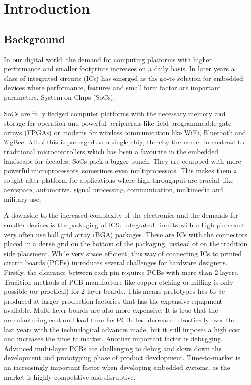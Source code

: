 \section{Introduction}

\subsection{Background}

In our digital world, the demand for computing platforms with higher performance and smaller footprints increases on a daily basis. In later years a class of integrated circuits (ICs) has emerged as the go-to solution for embedded devices where performance, features and small form factor are important parameters, System on Chips (SoCs).

SoCs are fully fledged computer platforms with the necessary memory and storage for operation and powerful peripherals like field programmeable gate arrays (FPGAs) or modems for wireless communication like WiFi, Bluetooth and ZigBee. All of this is packaged on a single chip, thereby the name. In contrast to traditional microcontrollers which has been a favourite in the embedded landscape for decades, SoCs pack a bigger punch. They are equipped with more powerful microprocessors, sometimes even multiprocessors. This makes them a sought after platform for applications where high throughput are crucial, like aerospace, automotive, signal processing, communication, multimedia and military use.

A downside to the increased complexity of the electronics and the demands for smaller devices is the packaging of ICS. Integrated circuits with a high pin count very often use ball grid array (BGA) packages. These are ICs with the connectors placed in a dense grid on the bottom of the packaging, instead of on the tradition side placement. While very space efficient, this way of connecting ICs to printed circuit boards (PCBs) introduces several challenges for hardware designers. Firstly, the clearance between each pin requires PCBs with more than 2 layers. Tradition methods of PCB manufacture like copper etching or milling is only possible (or proctical) for 2 layer boards. This means prototypes has to be produced at larger production factories that has the expensive equipment available. Multi-layer boards are also more expensive. It is true that the manufacturing cost and lead time for PCBs has decreased drastically over the last years with the technological advances made, but it still imposes a high cost and increases the time to market. Another important factor is debugging. Advanced multi-layer PCBs are challenging to debug and slows down the development and prototyping phase of product development. Time-to-market is an increasingly important factor when developing embedded systems, as the market is highly competitive and disruptive. 

